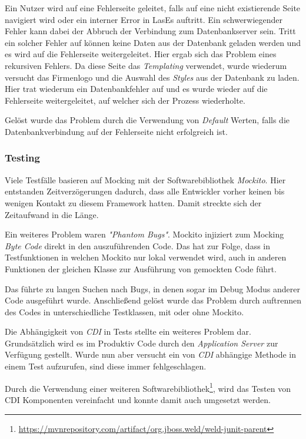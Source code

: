 Ein Nutzer wird auf eine Fehlerseite geleitet, falls auf eine nicht existierende Seite navigiert wird oder ein interner Error in LasEs auftritt.
Ein schwerwiegender Fehler kann dabei der Abbruch der Verbindung zum Datenbankserver sein.
Tritt ein solcher Fehler auf können keine Daten aus der Datenbank geladen werden und es wird auf die Fehlerseite weitergeleitet. Hier ergab sich das Problem eines rekursiven Fehlers.\newline
Da diese Seite das \emph{Templating} verwendet, wurde wiederum versucht das Firmenlogo und die Auswahl des \emph{Styles}  aus der Datenbank zu laden. Hier trat wiederum ein Datenbankfehler auf und es wurde wieder auf die Fehlerseite weitergeleitet, auf welcher sich der Prozess wiederholte.

Gelöst wurde das Problem durch die Verwendung von \emph{Default} Werten, falls die Datenbankverbindung auf der Fehlerseite nicht erfolgreich ist.

\subsubsection{Testing}

Viele Testfälle basieren auf Mocking mit der Softwarebibliothek \emph{Mockito}. Hier entstanden Zeitverzögerungen dadurch, dass alle Entwickler vorher keinen bis wenigen Kontakt zu diesem Framework hatten. Damit streckte sich der Zeitaufwand in die Länge.

Ein weiteres Problem waren \emph{"Phantom Bugs"}. Mockito injiziert zum Mocking \emph{Byte Code} direkt in den auszuführenden Code. Das hat zur Folge, dass in Testfunktionen in welchen Mockito nur lokal verwendet wird, auch
in anderen Funktionen der gleichen Klasse zur Ausführung von gemockten Code führt.

Das führte zu langen Suchen nach Bugs, in denen sogar im Debug Modus anderer Code ausgeführt wurde. Anschließend gelöst wurde das Problem durch auftrennen des Codes in unterschiedliche Testklassen, mit oder ohne Mockito.\newline

Die Abhängigkeit von \emph{CDI} in Tests stellte ein weiteres Problem dar. Grundsätzlich wird es im Produktiv Code durch den \emph{Application Server} zur Verfügung gestellt. Wurde nun aber versucht ein von \emph{CDI} abhängige Methode in einem Test aufzurufen, sind diese immer fehlgeschlagen.

Durch die Verwendung einer weiteren Softwarebibliothek\footnote{\url{https://mvnrepository.com/artifact/org.jboss.weld/weld-junit-parent}}, wird das Testen von CDI Komponenten vereinfacht und konnte damit auch umgesetzt werden.
